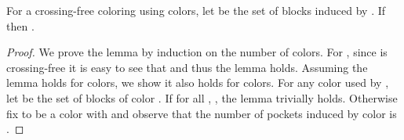 \documentclass{llncs}
\begin{document}
\begin{lemma}
For a {crossing-free coloring  using  colors}, let   be the set of blocks induced by  . If  then .
\label{indLem}
\end{lemma}
\begin{proof}

We prove the lemma by induction on the number  of colors. For , since  is crossing-free it is easy to see that  and thus the lemma holds.  Assuming the lemma holds for  colors, we show it also holds for  colors.  {For any color  used by , let  be the set of blocks of color }.  If for all , , the lemma trivially holds.  Otherwise fix  to be a color with  and observe that the number of pockets induced by color  is . 





\end{proof}
\end{document}
